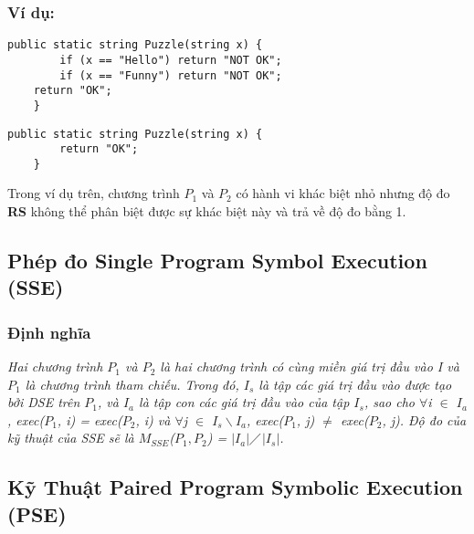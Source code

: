 	\subsubsection{Ví dụ:}
	
	\renewcommand{\lstlistingname}{Chương trình}
	\begin{lstlisting}[language={[Sharp]C}, caption={Chương trình $P_{1}$}, label={Script}]
	public static string Puzzle(string x) {
		if (x == "Hello") return "NOT OK";
		if (x == "Funny") return "NOT OK";
	return "OK";
	}
	\end{lstlisting}
	
	\renewcommand{\lstlistingname}{Chương trình}
	\begin{lstlisting}[language={[Sharp]C}, caption={Chương trình $P_{2}$}, label={Script}]
	public static string Puzzle(string x) {
		return "OK";
	}
	\end{lstlisting}
	
	Trong ví dụ trên, chương trình $P_{1}$ và $P_{2}$ có hành vi khác biệt nhỏ nhưng độ đo \textbf{RS} không thể phân biệt được sự khác biệt này và trả về độ đo bằng 1.
	
	
\subsection{Phép đo Single Program Symbol Execution (SSE)}
	\subsubsection{Định nghĩa}
	\textit{Hai chương trình $P_{1}$ và $P_{2}$ là hai chương trình có cùng miền giá trị đầu vào I và $P_{1}$ là chương trình tham chiếu. Trong đó, $I_{s}$ là tập các giá trị đầu vào được tạo bởi DSE trên $P_{1}$, và  $I_{a}$ là tập con các giá trị đầu vào của tập $I_{s}$, sao cho $\forall$i $\in$ $I_{a}$, exec($P_{1}$, i) = exec($P_{2}$, i) và $\forall$j $\in$ $I_{s} \backslash I_{a}$, exec($P_{1}$, j) $\neq$ exec($P_{2}$, j). Độ đo của kỹ thuật của SSE sẽ là $M_{SSE}$($P_{1},P_{2}$) = $\left|I_{a}\right|$$\diagup$$\left|I_{s}\right|$.}

\subsection{Kỹ Thuật Paired Program Symbolic Execution (PSE)}
